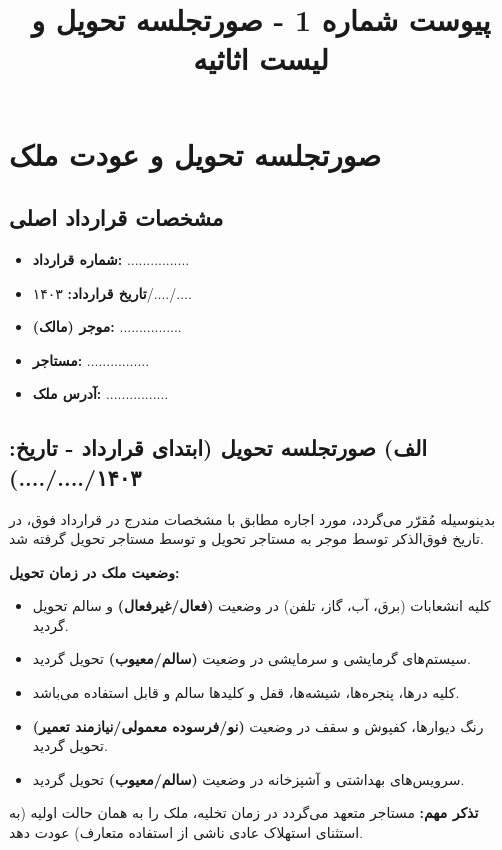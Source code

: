 \documentclass[12pt]{article}
\title{\textbf{پیوست شماره 1 - صورتجلسه تحویل و لیست اثاثیه}}
\author{}
\date{}
\begin{document}
	
	\maketitle
	
	\section*{\textbf{صورتجلسه تحویل و عودت ملک}}
	\subsection*{مشخصات قرارداد اصلی}
	\begin{itemize}
		\item \textbf{شماره قرارداد:} ................
		\item \textbf{تاریخ قرارداد:} ۱۴۰۳/..../....
		\item \textbf{موجر (مالک):} ................
		\item \textbf{مستاجر:} ................
		\item \textbf{آدرس ملک:} ................
	\end{itemize}
	
	\subsection*{الف) صورتجلسه تحویل (ابتدای قرارداد - تاریخ: ۱۴۰۳/..../....)}
	\noindent
	بدینوسیله مُقرّر می‌گردد، مورد اجاره مطابق با مشخصات مندرج در قرارداد فوق، در تاریخ فوق‌الذکر توسط موجر به مستاجر تحویل و توسط مستاجر تحویل گرفته شد.
	
	\noindent
	\textbf{وضعیت ملک در زمان تحویل:}
	
	\begin{itemize}
		\item کلیه انشعابات (برق، آب، گاز، تلفن) در وضعیت \textbf{(فعال/غیرفعال)} و سالم تحویل گردید.
		\item سیستم‌های گرمایشی و سرمایشی در وضعیت \textbf{(سالم/معیوب)} تحویل گردید.
		\item کلیه درها، پنجره‌ها، شیشه‌ها، قفل و کلیدها سالم و قابل استفاده می‌باشد.
		\item رنگ دیوارها، کفپوش و سقف در وضعیت \textbf{(نو/فرسوده معمولی/نیازمند تعمیر)} تحویل گردید.
		\item سرویس‌های بهداشتی و آشپزخانه در وضعیت \textbf{(سالم/معیوب)} تحویل گردید.
	\end{itemize}
	
	\noindent
	\textbf{تذکر مهم:} مستاجر متعهد می‌گردد در زمان تخلیه، ملک را به همان حالت اولیه (به استثنای استهلاک عادی ناشی از استفاده متعارف) عودت دهد.
	
\end{document}
